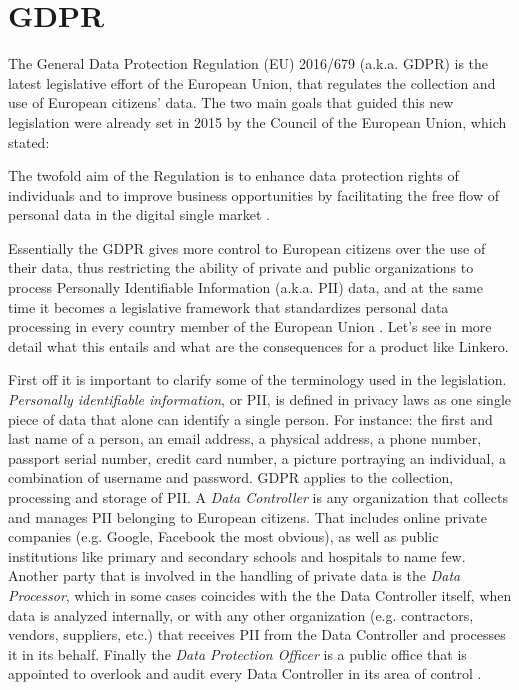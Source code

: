\section{GDPR}
The General Data Protection Regulation (EU) 2016/679 (a.k.a. GDPR) is the latest
legislative effort of the European Union, that regulates the collection
and use of European citizens' data. The two main goals that guided this new
legislation were already set in 2015 by the Council of the European Union, which
stated:
\begin{displayquote}
The twofold aim of the Regulation is to enhance data
protection rights of individuals and to improve business opportunities by facilitating the free
flow of personal data in the digital single market \cite{CoEU956515}.
\end{displayquote}
Essentially the GDPR gives more control to European citizens over the use of
their data, thus restricting the ability of private and public organizations to
process Personally Identifiable Information (a.k.a. PII) data, and at the same
time it becomes a legislative framework that standardizes personal data
processing in every country member of the European Union \cite{EU18}. Let's see
in more detail what this entails and what are the consequences for a product like
Linkero.

First off it is important to clarify some of the terminology used in the
legislation. \emph{Personally identifiable information}, or PII, is defined in
privacy laws as one single piece of data that alone can identify a single person. For
instance: the first and last name of a person, an email address, a physical
address, a phone number, passport serial number, credit card number, a picture portraying an
individual, a combination of username and password. GDPR applies to the
collection, processing and storage of PII. A \emph{Data Controller} is any
organization that collects and manages PII belonging to European citizens. That
includes online private companies (e.g. Google, Facebook the most obvious), as well as
public institutions like primary and secondary schools and hospitals to name
few. Another party that is involved in the handling of private data is the
\emph{Data Processor}, which in some cases coincides with the the Data
Controller itself, when data is analyzed internally, or with any other organization (e.g.
contractors, vendors, suppliers, etc.) that receives PII from the Data Controller
and processes it in its behalf. Finally the \emph{Data Protection Officer} is a
public office that is appointed to overlook and audit every Data Controller in
its area of control \cite{CR17}.

